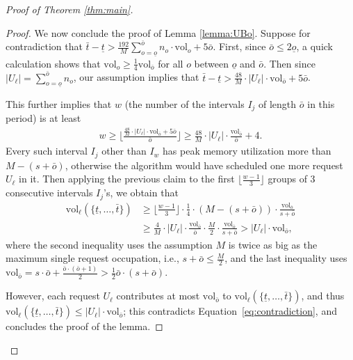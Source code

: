 \documentclass[11pt, a4paper]{article}
\theoremstyle{plain}
\theoremstyle{definition}
\theoremstyle{remark}
\newcommand{\vol}{\textrm{vol}}
\begin{document}
\begin{proof}[Proof of Theorem \ref{thm:main}]
\begin{proof}
	We now conclude the proof of Lemma \ref{lemma:UBo}.	Suppose for contradiction that $\bar{t} - \underline{t} > \frac{192}{M} \sum_{o = \underline{o}}^{\bar{o}} n_o \cdot \vol_o + 5\bar{o}$. First, since $\bar{o} \le 2 \underline{o}$, a quick calculation shows that $\vol_o \ge \frac{1}{4} \vol_{\overline{o}}$ for all $o$ between $\underline{o}$ and $\bar{o}$. Then since $|U_\ell| = \sum_{o = \underline{o}}^{\bar{o}} n_o$, our assumption implies that $\bar{t} - \underline{t} > \frac{48}{M} \cdot |U_\ell| \cdot \vol_{\bar{o}} + 5\bar{o}$. 
	
	This further implies that $w$ (the number of the intervals $I_j$ of length $\bar{o}$ in this period) is at least 
	\begin{align*}
	w \ge \bigg\lfloor \frac{\frac{48}{M} \cdot |U_\ell| \cdot \vol_{\bar{o}} + 5\bar{o}}{\bar{o}}  \bigg\rfloor \ge \frac{48}{M} \cdot |U_\ell| \cdot \frac{\vol_{\bar{o}}}{\bar{o}} + 4.
	\end{align*}
	Every such interval $I_j$ other than $I_w$ has peak memory utilization more than $M - (s + \bar{o})$, otherwise the algorithm would have scheduled one more request $U_\ell$ in it. Then applying the previous claim to the first $\lfloor \frac{w-1}{3} \rfloor$ groups of 3 consecutive intervals $I_j$'s, we obtain that 
	\begin{align}
	\vol_\ell(\{\underline{t},\ldots,\bar{t}\}) &\ge \bigg\lfloor \frac{w-1}{3} \bigg\rfloor \cdot \frac{1}{4} \cdot (M - (s+\bar{o})) \cdot \frac{\vol_{\bar{o}}}{s+\bar{o}} \nonumber \\
	& \ge \frac{4}{M} \cdot |U_\ell| \cdot \frac{\vol_{\bar{o}}}{\bar{o}} \cdot \frac{M}{2} \cdot \frac{\vol_{\bar{o}}}{s+\bar{o}} > |U_\ell| \cdot \vol_{\bar{o}}, \label{eq:contradiction}
	\end{align}
	where the second inequality uses the assumption $M$ is twice as big as the maximum single request occupation, i.e., $s + \bar{o} \le \frac{M}{2}$, and the last inequality uses $\vol_{\bar{o}} = s \cdot \bar{o} + \frac{\bar{o} \cdot (\bar{o}+1)}{2} > \frac{1}{2} \bar{o} \cdot (s + \bar{o})$. 
	
	However, each request $U_\ell$ contributes at most $\vol_{\bar{o}}$ to $\vol_\ell(\{\underline{t},\ldots,\bar{t}\})$, and thus $\vol_\ell(\{\underline{t},\ldots,\bar{t}\}) \le |U_\ell| \cdot \vol_{\bar{o}}$; this contradicts Equation~\eqref{eq:contradiction}, and concludes the proof of the lemma. 	
\end{proof}




\end{proof}
\end{document}
